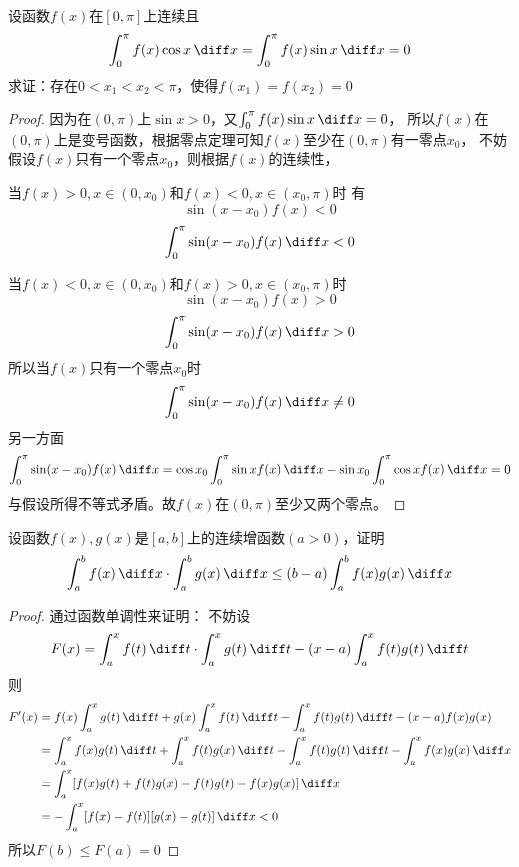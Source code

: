 \begin{example}
    设函数$f(x)$在$[0,\pi]$上连续且
    \[ \int_0^\pi f(x)\cos x\,\diff x = \int_0^\pi f(x)\sin x\,\diff x = 0 \]
    求证：存在$0<x_1<x_2<\pi$，使得$f(x_1)=f(x_2)=0$
\end{example}
\begin{proof}
    因为在$(0,\pi)$上$\sin x > 0$，又$\int_0^\pi f(x)\sin x\,\diff x = 0$，
    所以$f(x)$在$(0,\pi)$上是变号函数，根据零点定理可知$f(x)$至少在$(0,\pi)$有一零点$x_0$，
    不妨假设$f(x)$只有一个零点$x_0$，则根据$f(x)$的连续性，

    当$f(x)>0,x\in(0,x_0)$和$f(x)<0,x\in(x_0,\pi)$时
    有
    \[ \sin(x-x_0)f(x) < 0 \]
    \[ \int_0^\pi \sin(x-x_0)f(x)\,\diff x < 0 \]

    当$f(x)<0,x\in(0,x_0)$和$f(x)>0,x\in(x_0,\pi)$时
    \[ \sin(x-x_0)f(x) > 0 \]
    \[ \int_0^\pi \sin(x-x_0)f(x)\,\diff x > 0 \]
    所以当$f(x)$只有一个零点$x_0$时
    \[ \int_0^\pi \sin(x-x_0)f(x)\,\diff x \neq 0 \]
    另一方面
    \[
        \int_0^\pi \sin(x-x_0)f(x)\,\diff x
        =
        \cos x_0\int_0^\pi \sin xf(x)\,\diff x - \sin x_0\int_0^\pi \cos xf(x)\,\diff x
        =
        0
    \]
    与假设所得不等式矛盾。故$f(x)$在$(0,\pi)$至少又两个零点。
\end{proof}
\begin{example}
    设函数$f(x),g(x)$是$[a,b]$上的连续增函数$(a>0)$，证明
    \[ \int_a^bf(x)\,\diff x \cdot \int_a^bg(x)\,\diff x \leq (b-a)\int_a^bf(x)g(x)\,\diff x \]
\end{example}
\begin{proof}
    通过函数单调性来证明：
    不妨设
    \[ F(x) = \int_a^xf(t)\,\diff t \cdot \int_a^xg(t)\,\diff t - (x-a)\int_a^xf(t)g(t)\,\diff t \]
    则
    \begin{align*}
        F'(x) & = f(x)\int_a^xg(t)\,\diff t + g(x)\int_a^xf(t)\,\diff t - \int_a^xf(t)g(t)\,\diff t - (x-a)f(x)g(x)              \\
              & =\int_a^xf(x)g(t)\,\diff t + \int_a^xf(t)g(x)\,\diff t - \int_a^xf(t)g(t)\,\diff t - \int_a^x f(x)g(x)\, \diff x \\
              & =\int_a^x[f(x)g(t) + f(t)g(x) - f(t)g(t) -  f(x)g(x)]\, \diff x                                                  \\
              & =-\int_a^x[f(x)- f(t)][g(x) - g(t)]\, \diff x < 0
    \end{align*}
    所以$F(b)\leq F(a)=0$
\end{proof}

